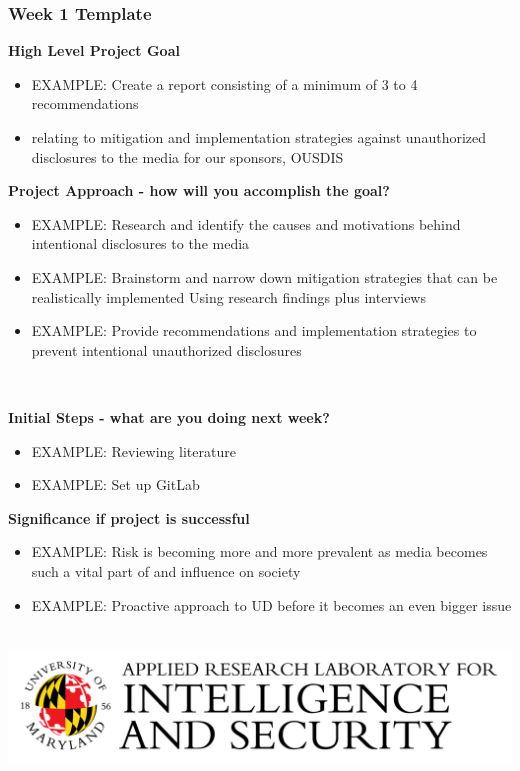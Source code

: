 \documentclass[usenames,dvipsnames]{beamer} %
\newcommand\FourQuad[4]{%
    \begin{minipage}[b][.35\textheight][t]{.47\textwidth}#1\end{minipage}\hfill%
    \begin{minipage}[b][.35\textheight][t]{.47\textwidth}#2\end{minipage}\\[0.5em]
    \begin{minipage}[b][.35\textheight][t]{.47\textwidth}#3\end{minipage}\hfill
    \begin{minipage}[b][.35\textheight][t]{.47\textwidth}#4\end{minipage}\\
    \includegraphics[scale=0.05]{Papers/Presentations/Figures/arlis.png}
}
\begin{document}
    \begin{frame}
        \frametitle{\textcolor{Mahogany}{Week 1 Template}}
        \FourQuad%
        {
            \tiny{
                \textbf{High Level Project Goal}  
                \begin{itemize}
                    \item EXAMPLE: Create a report consisting of a minimum of  3 to 4 recommendations
                    \item relating to mitigation and  implementation strategies against unauthorized  disclosures to the media for our sponsors, OUSDIS 
                \end{itemize} 
            }
        }%
        {
            \tiny{
                \textbf{Project Approach - how will you accomplish the goal?} 
                \begin{itemize}
                    \item EXAMPLE: Research and identify the causes and  motivations behind intentional disclosures to the media 
                    \item EXAMPLE: Brainstorm and narrow down mitigation  strategies that can be realistically implemented Using research findings plus interviews 
                    \item EXAMPLE: Provide recommendations and implementation strategies to prevent intentional unauthorized disclosures  
                \end{itemize}
            }
        }%
        {
            \tiny{
                \textbf{Initial Steps - what are you doing next week?}
                \begin{itemize}
                    \item EXAMPLE: Reviewing literature 
                    \item EXAMPLE: Set up GitLab
                \end{itemize}   
            }
        }%
        {
            \tiny{
                \textbf{Significance if project is successful}
                \begin{itemize}
                    \item EXAMPLE: Risk is becoming more and more prevalent as  media becomes such a vital part of and influence on  society  
                    \item EXAMPLE: Proactive approach to UD before it becomes  an even bigger issue 
                \end{itemize} 
            }
        }
    \end{frame}
    
\end{document}
